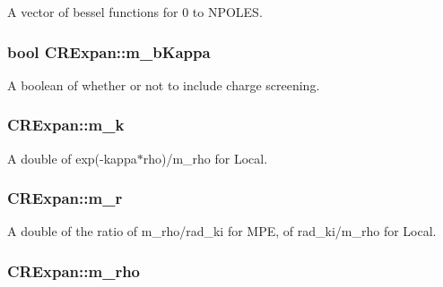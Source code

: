 A vector of bessel functions for 0 to N\-P\-O\-L\-E\-S. 

\hypertarget{classCRExpan_a4da0a777c6bb220946cb921e4b45e987}{
\subsubsection[{m\-\_\-b\-Kappa}]{\setlength{\rightskip}{0pt plus 5cm}bool C\-R\-Expan\-::m\-\_\-b\-Kappa\hspace{0.3cm}{\ttfamily [protected]}}}\label{classCRExpan_a4da0a777c6bb220946cb921e4b45e987}


A boolean of whether or not to include charge screening. 

\hypertarget{classCRExpan_a8c07810ecf1ec1138d0f035295561072}{
\subsubsection[{m\-\_\-k}]{ C\-R\-Expan\-::m\-\_\-k\hspace{0.3cm}{\ttfamily [protected]}}}\label{classCRExpan_a8c07810ecf1ec1138d0f035295561072}


A double of exp(-\/kappa$\ast$rho)/m\-\_\-rho for Local. 

\hypertarget{classCRExpan_a7a51c089318b660b6dd29f4b200d55ca}{
\subsubsection[{m\-\_\-r}]{ C\-R\-Expan\-::m\-\_\-r\hspace{0.3cm}{\ttfamily [protected]}}}\label{classCRExpan_a7a51c089318b660b6dd29f4b200d55ca}


A double of the ratio of m\-\_\-rho/rad\-\_\-ki for M\-P\-E, of rad\-\_\-ki/m\-\_\-rho for Local. 

\hypertarget{classCRExpan_a7957dc7c75cb4f62d8e387c63ec82692}{
\subsubsection[{m\-\_\-rho}]{ C\-R\-Expan\-::m\-\_\-rho\hspace{0.3cm}{\ttfamily [protected]}}}\label{classCRExpan_a7957dc7c75cb4f62d8e387c63ec82692}


